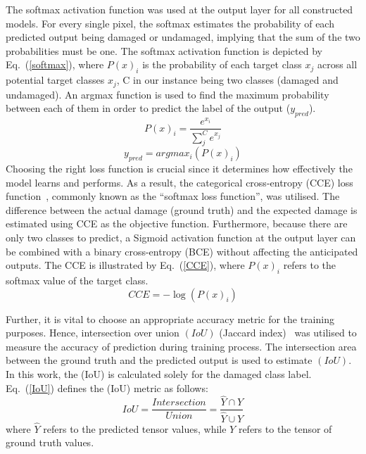 The softmax activation function was used at the output layer for all constructed models.
For every single pixel, the softmax estimates the probability of each predicted output being damaged or undamaged, implying that the sum of the two probabilities must be one.
The softmax activation function is depicted by Eq.~(\ref{softmax}), where \(P(x)_{i}\) is the probability of each target class \(x_{j}\) across all potential target classes \(x_{j}\), C in our instance being two classes (damaged and undamaged).
An argmax function is used to find the maximum probability between each of them in order to predict the label of the output (\(y_{pred}\)).
\begin{equation}
	P(x)_{i} = \frac{e^{x_{i}}}{\sum_{j}^{C} e^{x_{j}}}
	\label{softmax}
\end{equation} 
\begin{equation}
	y_{pred} = argmax_{i}\left( P(x)_{i} \right)
	\label{argmax}
\end{equation}
Choosing the right loss function is crucial since it determines how effectively the model learns and performs.
As a result, the categorical cross-entropy (CCE) loss function~\cite{Bonaccorso2020}, commonly known as the \enquote{softmax loss function}, was utilised.
The difference between the actual damage (ground truth) and the expected damage is estimated using CCE as the objective function.
Furthermore, because there are only two classes to predict, a Sigmoid activation function at the output layer can be combined with a binary cross-entropy (BCE) without affecting the anticipated outputs.
The CCE is illustrated by Eq.~(\ref{CCE}), where \( P(x)_{i}\) refers to the softmax value of the target class.
\begin{equation}	
	CCE = -\log\left( P(x)_{i} \right)
	\label{CCE}
\end{equation}

Further, it is vital to choose an appropriate accuracy metric for the training purposes.
Hence, intersection over union \((IoU)\) (Jaccard index)~\cite{Bertels2019} was utilised to measure the accuracy of prediction during training process.
The intersection area between the ground truth and the predicted output is used to estimate \((IoU)\).
In this work, the (IoU) is calculated solely for the damaged class label.
Eq.~(\ref{IoU}) defines the (IoU) metric as follows:
\begin{equation}
	IoU = \frac{Intersection}{Union} = \frac{\hat{Y} \cap Y}{\hat{Y} \cup Y} 
	\label{IoU}
\end{equation}
where \(\hat{Y}\) refers to the predicted tensor values, while \(Y\) refers to the tensor of ground truth values.

